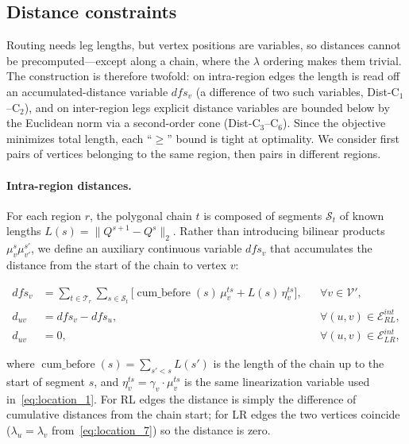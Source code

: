 \documentclass[12pt]{elsarticle}
\begin{document}
\subsection{Distance constraints}

Routing needs leg lengths, but vertex positions are variables, so distances cannot be precomputed---except along a chain, where the $\lambda$ ordering makes them trivial. The construction is therefore twofold: on intra-region edges the length is read off an accumulated-distance variable $dfs_v$ (a difference of two such variables, Dist-C$_1$--C$_2$), and on inter-region legs explicit distance variables are bounded below by the Euclidean norm via a second-order cone (Dist-C$_3$--C$_6$). Since the objective minimizes total length, each ``$\ge$'' bound is tight at optimality. We consider first pairs of vertices belonging to the same region, then pairs in different regions.

\paragraph{Intra-region distances.}
For each region $r$, the polygonal chain $t$ is composed of segments $\mathcal S_t$ of known lengths $L(s)=\|Q^{s+1}-Q^s\|_2$. Rather than introducing bilinear products $\mu_v^s\mu_{v'}^{s'}$, we define an auxiliary continuous variable $dfs_v$ that accumulates the distance from the start of the chain to vertex $v$:

\begin{align}
    dfs_v &= \sum_{t\in\mathcal T_r}\sum_{s\in\mathcal S_t}
            \bigl[ \operatorname{cum\_before}(s)\,\mu_v^{ts}
            + L(s)\,\eta_v^{ts} \bigr],
            && \forall v\in\mathcal V',
            \label{eq:dfs}\tag{Dist-C$_1$}\\[2mm]
    d_{uv} &= dfs_v - dfs_u,
            && \forall (u,v)\in\mathcal E_{RL}^{int},
            \label{eq:dist_int_rl}\tag{Dist-C$_2$}\\
    d_{uv} &= 0,
            && \forall (u,v)\in\mathcal E_{LR}^{int},
            \label{eq:dist_int_lr}\tag{Dist-C$_3$}
\end{align}

\noindent where $\operatorname{cum\_before}(s)=\sum_{s'<s}L(s')$ is the length of the chain up to the start of segment $s$, and $\eta_v^{ts}=\gamma_v\cdot\mu_v^{ts}$ is the same linearization variable used in~\eqref{eq:location_1}. For RL edges the distance is simply the difference of cumulative distances from the chain start; for LR edges the two vertices coincide ($\lambda_u=\lambda_v$ from~\eqref{eq:location_7}) so the distance is zero.
\end{document}
